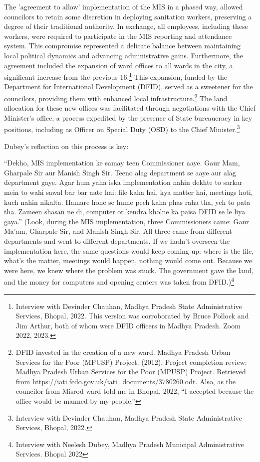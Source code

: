 The 'agreement to allow' implementation of the MIS in a phased way, allowed councilors to retain some discretion in deploying sanitation workers, preserving a degree of their traditional authority. In exchange, all employees, including these workers, were required to participate in the MIS reporting and attendance system. This compromise represented a delicate balance between maintaining local political dynamics and advancing administrative gains. Furthermore, the agreement included the expansion of ward offices to all wards in the city, a significant increase from the previous 16.\footnote{Interview with Devinder Chauhan, Madhya Pradesh State Administrative Services, Bhopal, 2022. This version was corroborated by Bruce Pollock and Jim Arthur, both of whom were DFID officers in Madhya Pradesh. Zoom 2022, 2023.} This expansion, funded by the Department for International Development (DFID), served as a sweetener for the councilors, providing them with enhanced local infrastructure.\footnote{DFID invested in the creation of a new ward. Madhya Pradesh Urban Services for the Poor (MPUSP) Project. (2012). Project completion review: Madhya Pradesh Urban Services for the Poor (MPUSP) Project. Retrieved from https://iati.fcdo.gov.uk/iati\_documents/3780260.odt. Also, as the councilor from Misrod ward told me in Bhopal, 2022, ``I accepted because the office would be manned by my people.''} The land allocation for these new offices was facilitated through negotiations with the Chief Minister's office, a process expedited by the presence of State bureaucracy in key positions, including as Officer on Special Duty (OSD) to the Chief Minister.\footnote{Interview with Devinder Chauhan, Madhya Pradesh State Administrative Services, Bhopal, 2022.}

Dubey's reflection on this process is key:

``Dekho, MIS implementation ke samay teen Commissioner aaye. Gaur Mam, Gharpale Sir aur Manish Singh Sir. Teeno alag department se aaye aur alag department gaye.
Agar hum yaha iska implementation nahin dekhte to sarkar mein to wahi sawal bar bar aate hai: file kaha hai, kya matter hai, meetings hoti, kuch nahin nikalta. Hamare hone se hume pech kaha phas raha tha, yeh to pata tha. Zameen shasan ne di, computer or kendra kholne ka paisa DFID se le liya gaya.'' (Look, during the MIS implementation, three Commissioners came: Gaur Ma'am, Gharpale Sir, and Manish Singh Sir. All three came from different departments and went to different departments. If we hadn't overseen the implementation here, the same questions would keep coming up: where is the file, what's the matter, meetings would happen, nothing would come out. Because we were here, we knew where the problem was stuck. The government gave the land, and the money for computers and opening centers was taken from DFID.)\footnote{Interview with Neelesh Dubey, Madhya Pradesh Municipal Administrative Services. Bhopal 2022}

